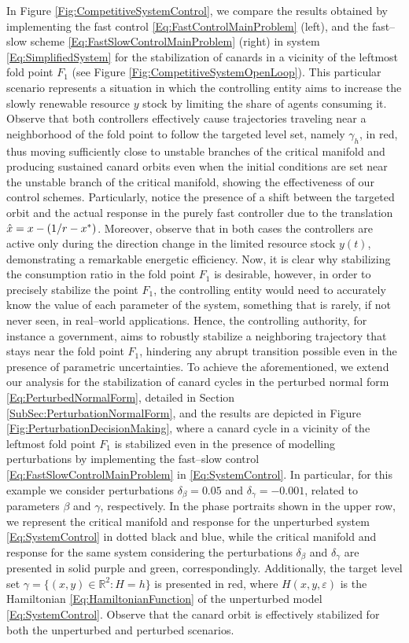 \documentclass[3p]{elsarticle}
\theoremstyle{plain}
\theoremstyle{remark}
\theoremstyle{definition}
\begin{document}
    In Figure \ref{Fig:CompetitiveSystemControl}, we compare the results obtained by implementing the fast control \eqref{Eq:FastControlMainProblem} (left), and the fast--slow scheme \eqref{Eq:FastSlowControlMainProblem} (right) in system \eqref{Eq:SimplifiedSystem} for the stabilization of canards in a vicinity of the leftmost fold point $F_1$ (see Figure \ref{Fig:CompetitiveSystemOpenLoop}). This particular scenario represents a situation in which the controlling entity aims to increase the slowly renewable resource $y$ stock by limiting the share of agents consuming it. Observe that both controllers effectively cause trajectories traveling near a neighborhood of the fold point to follow the targeted level set, namely $\gamma_{h}$, in red, thus moving sufficiently close to unstable branches of the critical manifold and producing sustained canard orbits even when the initial conditions are set near the unstable branch of the critical manifold, showing the effectiveness of our control schemes. Particularly, notice the presence of a shift between the targeted orbit and the actual response in the purely fast controller due to the translation $\Hat{x} = x - (1/r - x^{*})$. Moreover, observe that in both cases the controllers are active only during the direction change in the limited resource stock $y(t)$, demonstrating a remarkable energetic efficiency. Now, it is clear why stabilizing the consumption ratio in the fold point $F_1$ is desirable, however, in order to precisely stabilize the point $F_1$, the controlling entity would need to accurately know the value of each parameter of the system, something that is rarely, if not never seen, in real--world applications. Hence, the controlling authority, for instance a government, aims to robustly stabilize a neighboring trajectory that stays near the fold point $F_1$, hindering any abrupt transition possible even in the presence of parametric uncertainties. To achieve the aforementioned, we extend our analysis for the stabilization of canard cycles in the perturbed normal form \eqref{Eq:PerturbedNormalForm}, detailed in Section \ref{SubSec:PerturbationNormalForm}, and the results are depicted in Figure \ref{Fig:PerturbationDecisionMaking}, where a canard cycle in a vicinity of the leftmost fold point $F_{1}$ is stabilized even in the presence of modelling perturbations by implementing the fast--slow control \eqref{Eq:FastSlowControlMainProblem} in \eqref{Eq:SystemControl}. In particular, for this example we consider perturbations $\delta_{\beta}=0.05$ and $\delta_{\gamma}=-0.001$, related to parameters $\beta$ and $\gamma$, respectively. In the phase portraits shown in the upper row, we represent the critical manifold and response for the unperturbed system \eqref{Eq:SystemControl} in dotted black and blue, while the critical manifold and response for the same system considering the perturbations $\delta_{\beta}$ and $\delta_{\gamma}$ are presented in solid purple and green, correspondingly. Additionally, the target level set $\gamma = \{ (x,y)\in \mathbb{R}^{2}: H=h \}$ is presented in red, where $H(x,y,\varepsilon)$ is the Hamiltonian \eqref{Eq:HamiltonianFunction} of the unperturbed model \eqref{Eq:SystemControl}. Observe that the canard orbit is effectively stabilized for both the unperturbed and perturbed scenarios. 
\end{document}
